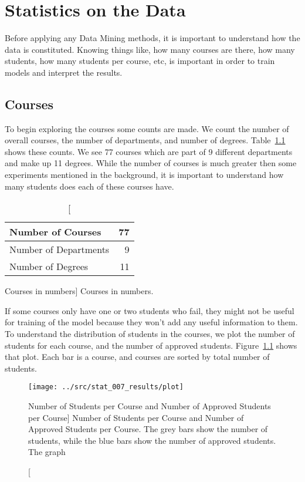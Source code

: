 \chapter{Statistics on the Data}
\label{sec:stats}

Before applying any Data Mining methods, it is important to understand how the
data is constituted. Knowing things like, how many courses are there, how many
students, how many students per course, etc, is important in order to train
models and interpret the results.

\section{Courses}

To begin exploring the courses some counts are made. We count the number of
overall courses, the number of departments, and number of degrees.
Table~\ref{tab:courses_stats} shows these counts. We see 77 courses which are
part of 9 different departments and make up 11 degrees. While the number of
courses is much greater then some experiments mentioned in the background, it
is important to understand how many students does each of these courses have.

\begin{table}[h!]
    \centering

    \begin{tabular}{| l | r |}
        \hline
        Number of Courses     & 77 \\ \hline
        Number of Departments & 9  \\ \hline
        Number of Degrees     & 11 \\ \hline
    \end{tabular}

    \caption
        [Courses in numbers]
        {Courses in numbers.}

    \label{tab:courses_stats}
\end{table}

If some courses only have one or two students who fail, they might not be
useful for training of the model because they won't add any useful information
to them. To understand the distribution of students in the courses, we plot the
number of students for each course, and the number of approved students.
Figure~\ref{fig:stat_007} shows that plot. Each bar is a course, and courses
are sorted by total number of students.

\begin{figure}[h!]
    \centering

    \texttt{[image: ../src/stat\_007\_results/plot]}

    \caption
        [Number of Students per Course and Number of Approved Students per
        Course]
        {Number of Students per Course and Number of Approved Students per
        Course. The grey bars show the number of students, while the blue bars
        show the number of approved students. The graph}

    \label{fig:stat_007}
\end{figure}

